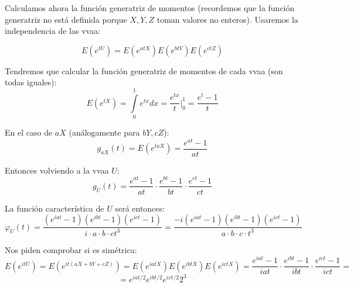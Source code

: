 \documentclass[openany]{book}
\begin{document}
\begin{exercise}
    Calculamos ahora la función generatriz de momentos (recordemos que la función generatriz no está definida porque $ X,Y,Z $ toman valores no enteros). Usaremos la independencia de las vvaa:

    $$E(e^{tU}) = E(e^{atX})E(e^{btY}) E(e^{ctZ}) $$

    Tendremos que calcular la función generatriz de momentos de cada vvaa (son todas iguales):
    $$ E(e^{tX}) = \int\limits_{0}^{1} e^{tx} dx = \dfrac{e^{tx}}{t} \Biggr|_{0}^{1} = \dfrac{e^{t}-1}{t} $$
    
    En el caso de $ aX $ (análogamente para $ bY,cZ $):
    $$ g_{aX}(t) = E(e^{taX}) = \dfrac{e^{at}-1}{at} $$

    Entonces volviendo a la vvaa $ U $:
    $$ g_{U}(t) = \dfrac{e^{at}-1}{at}\cdot \dfrac{e^{bt}-1}{bt}\cdot \dfrac{e^{ct}-1}{ct} $$

    La función característica de $ U $ será entonces:
    $$ \varphi_{U} (t) = \dfrac{(e^{iat}-1)(e^{ibt}-1)(e^{ict}-1)}{i\cdot a\cdot b\cdot c t^3}  = \dfrac{-i(e^{iat}-1)(e^{ibt}-1)(e^{ict}-1)}{ a\cdot b\cdot c \cdot  t^3}$$

    Nos piden comprobar si es simétrica:
    $$ E(e^{itU}) = E(e^{it(aX+bY+cZ)}) = E(e^{iatX})E(e^{ibtX})E(e^{ictX}) = \dfrac{e^{iat}-1}{iat} \cdot \dfrac{e^{ibt}-1}{ibt} \cdot  \dfrac{e^{ict}-1}{ict} = $$
    $$=e^{iat/2}e^{ibt/2}e^{ict/2} 2^3 $$

\end{exercise}  
\end{document}
